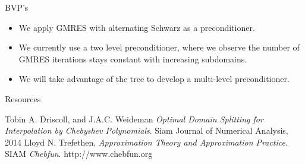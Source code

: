 \documentclass{beamer}
\begin{document}
\begin{frame}{BVP's}
\begin{itemize}
\item We apply GMRES with alternating Schwarz as a preconditioner.
\item We currently use a two level preconditioner, where we observe the number of GMRES iterations stays constant with increasing subdomains.
\item We will take advantage of the tree to develop a multi-level preconditioner.
\end{itemize}

\end{frame}

\begin{frame}{Resources}
\begin{thebibliography}{9}
Tobin A. Driscoll, and J.A.C. Weideman
\textit{Optimal Domain Splitting for Interpolation by Chebyshev Polynomials}. 
Siam Journal of Numerical Analysis, 2014
Lloyd N. Trefethen,
\textit{Approximation Theory and Approximation Practice}. 
SIAM
\textit{Chebfun}. 
http://www.chebfun.org
\end{thebibliography}
\end{frame}
\end{document}
